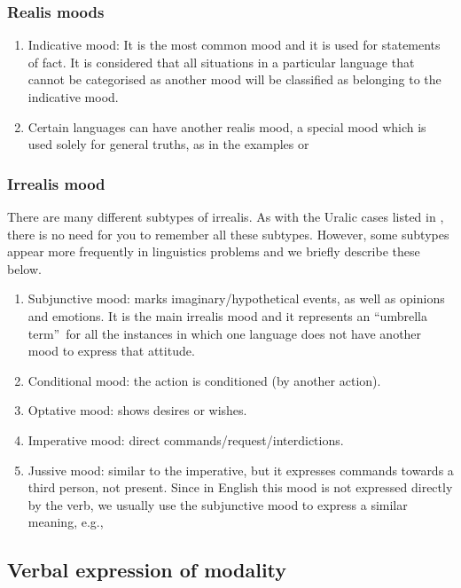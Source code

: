 \begin{refsection}
\subsubsection{Realis moods}

\begin{enumerate}
    \item Indicative mood: It is the most common mood and it is used for statements of fact. It is considered that all situations in a particular language that cannot be categorised as another mood will be classified as belonging to the indicative mood. 
    \item Certain languages can have another realis mood, a special mood which is used solely for general truths, as in the examples  or  
\end{enumerate}

\subsubsection{Irrealis mood}

There are many different subtypes of irrealis. As with the Uralic cases listed in , there is no need for you to remember all these subtypes. However, some subtypes appear more frequently in linguistics problems and we briefly describe these below.
\begin{enumerate}
    \item Subjunctive mood: marks imaginary/hypothetical events, as well as opinions and emotions. It is the main irrealis mood and it represents an “um\-brel\-la term”\ for all the instances in which one language does not have another mood to express that attitude. 
    \item Conditional mood: the action is conditioned (by another action). 
    \item Optative mood: shows desires or wishes.
    \item Imperative mood: direct commands/request/interdictions.
    \item Jussive mood: similar to the imperative, but it expresses commands towards a third person, not present. Since in English this mood is not expressed directly by the verb, we usually use the subjunctive mood to express a similar meaning, e.g., 
\end{enumerate}

\subsection{Verbal expression of modality}


\end{refsection}
